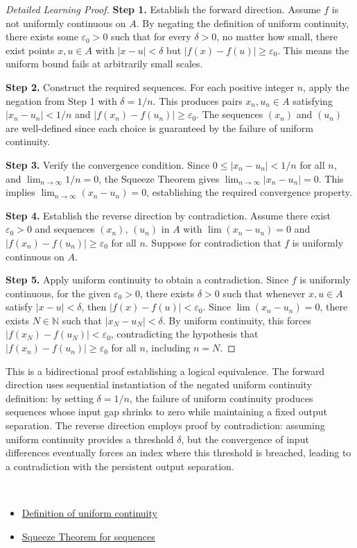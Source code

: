 \begin{proof}[Detailed Learning Proof]
\LRAProofBodyStart

\textbf{Step 1.} Establish the forward direction. Assume $f$ is not uniformly continuous on $A$. By negating the definition of uniform continuity, there exists some $\varepsilon_0 > 0$ such that for every $\delta > 0$, no matter how small, there exist points $x, u \in A$ with $|x - u| < \delta$ but $|f(x) - f(u)| \geq \varepsilon_0$. This means the uniform bound fails at arbitrarily small scales.

\textbf{Step 2.} Construct the required sequences. For each positive integer $n$, apply the negation from Step 1 with $\delta = 1/n$. This produces pairs $x_n, u_n \in A$ satisfying $|x_n - u_n| < 1/n$ and $|f(x_n) - f(u_n)| \geq \varepsilon_0$. The sequences $(x_n)$ and $(u_n)$ are well-defined since each choice is guaranteed by the failure of uniform continuity.

\textbf{Step 3.} Verify the convergence condition. Since $0 \leq |x_n - u_n| < 1/n$ for all $n$, and $\lim_{n \to \infty} 1/n = 0$, the Squeeze Theorem gives $\lim_{n \to \infty} |x_n - u_n| = 0$. This implies $\lim_{n \to \infty} (x_n - u_n) = 0$, establishing the required convergence property.

\textbf{Step 4.} Establish the reverse direction by contradiction. Assume there exist $\varepsilon_0 > 0$ and sequences $(x_n)$, $(u_n)$ in $A$ with $\lim(x_n - u_n) = 0$ and $|f(x_n) - f(u_n)| \geq \varepsilon_0$ for all $n$. Suppose for contradiction that $f$ is uniformly continuous on $A$.

\textbf{Step 5.} Apply uniform continuity to obtain a contradiction. Since $f$ is uniformly continuous, for the given $\varepsilon_0 > 0$, there exists $\delta > 0$ such that whenever $x, u \in A$ satisfy $|x - u| < \delta$, then $|f(x) - f(u)| < \varepsilon_0$. Since $\lim(x_n - u_n) = 0$, there exists $N \in \mathbb{N}$ such that $|x_N - u_N| < \delta$. By uniform continuity, this forces $|f(x_N) - f(u_N)| < \varepsilon_0$, contradicting the hypothesis that $|f(x_n) - f(u_n)| \geq \varepsilon_0$ for all $n$, including $n = N$.
\end{proof}

\begin{remark*}
This is a bidirectional proof establishing a logical equivalence. The forward direction uses sequential instantiation of the negated uniform continuity definition: by setting $\delta = 1/n$, the failure of uniform continuity produces sequences whose input gap shrinks to zero while maintaining a fixed output separation. The reverse direction employs proof by contradiction: assuming uniform continuity provides a threshold $\delta$, but the convergence of input differences eventually forces an index where this threshold is breached, leading to a contradiction with the persistent output separation.
\end{remark*}

\begin{remark*}[Dependencies]~\\
\begin{itemize}
  \item \hyperref[def:uniform-continuity]{Definition of uniform continuity}
  \item \hyperref[thm:squeeze-theorem-sequences]{Squeeze Theorem for sequences}
\end{itemize}
\end{remark*}
